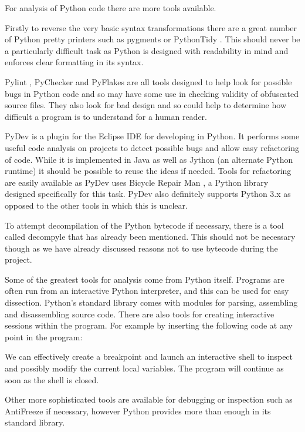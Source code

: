 \documentclass[twoside,a4paper]{report}
\begin{document}
For analysis of Python code there are more tools available.

Firstly to reverse the very basic syntax transformations there are a great number of Python pretty printers such as
pygments \cite{pygments} or PythonTidy \cite{pythontidy}. This should never be a particularly difficult task as Python is
designed with readability in mind and enforces clear formatting in its syntax.

Pylint \cite{pylint}, PyChecker \cite{pychecker} and PyFlakes \cite{pyflakes} are all tools designed to help look for possible
bugs in Python code and so may have some use in checking validity of obfuscated source files. They also look for bad design and so
could help to determine how difficult a program is to understand for a human reader.

PyDev \cite{pydev} is a plugin for the Eclipse IDE for developing in Python. It performs some useful code analysis on projects to detect
possible bugs and allow easy refactoring of code. While it is implemented in Java as well as Jython (an alternate Python runtime)
it should be possible to reuse the ideas if needed. Tools for refactoring are easily available as PyDev uses Bicycle Repair
Man \cite{bikerepair}, a Python library designed specifically for this task. PyDev also definitely supports Python 3.x as opposed to the
other tools in which this is unclear.

To attempt decompilation of the Python bytecode if necessary, there is a tool called decompyle \cite{decompyle} that has already been
mentioned. This should not be necessary though as we have already discussed reasons not to use bytecode during the project.

Some of the greatest  tools for analysis come from Python itself. Programs are often run from an interactive Python interpreter, and this
can be used for easy dissection. Python's standard library comes with modules for parsing, assembling and disassembling source code.
There are also tools for creating interactive sessions within the program. For example by inserting the following code at any point
in the program:



We can effectively create a breakpoint and launch an interactive shell to inspect and possibly modify the current local
variables. The program will continue as soon as the shell is closed.

Other more sophisticated tools are available for debugging or inspection such as AntiFreeze \cite{pirates} if necessary,
however Python provides more than enough in its standard library.
\end{document}
